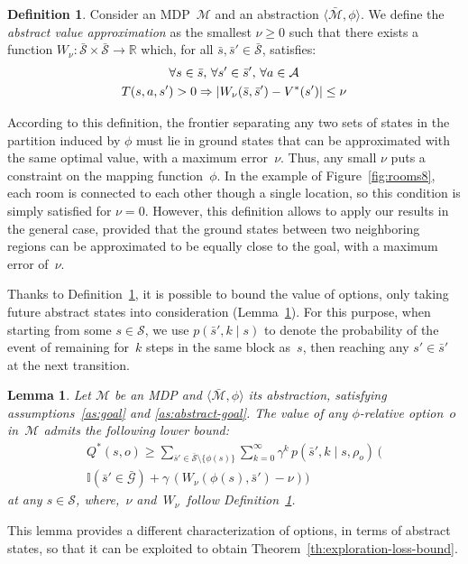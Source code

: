 \documentclass[letterpaper]{article} %
\theoremstyle{plain}
\newtheorem{lemma}{Lemma}
\theoremstyle{definition}
\newtheorem{definition}{Definition}
\theoremstyle{remark}
\DeclarePairedDelimiter{\abs}{\lvert}{\rvert}
\newcommand{\Reals}{\mathbb{R}}
\newcommand{\Given}{\mid}
\newcommand{\Indicator}{\mathbb{I}}
\renewcommand{\implies}{\Rightarrow}
\renewcommand{\implies}{\Rightarrow}
\newcommand{\SetSym}[1]{\mathcal{#1}}
\newcommand{\Policy}{\rho}
\newcommand{\States}{\SetSym{S}}
\newcommand{\Actions}{\SetSym{A}}
\newcommand{\Model}{\SetSym{M}}
\newcommand{\Mapping}{\phi}
\newcommand{\Abst}[1]{\bar{#1}}
\newcommand{\Goals}{\SetSym{G}}
\newcommand{\FromBlockTo}[3]{{#3}, {#2}}
\newcommand{\PHomogeneity}{\nu}
\begin{document}
\begin{definition}
Consider an MDP~$\Model$ and an abstraction $\langle \Abst\Model, \Mapping \rangle$.
We define the \emph{abstract value approximation} as the smallest $\PHomogeneity \ge 0$ such that
there exists a function $W_{\PHomogeneity}: {\Abst\States \times \Abst\States \to \Reals}$
which, for all $\Abst{s}, \Abst{s}' \in \Abst\States$, satisfies:
\begin{multline}
\forall s \in \Abst{s},\, \forall s' \in \Abst{s}',\, \forall a \in \Actions\\
T(s, a, s') > 0 \implies  \abs{W_\PHomogeneity(\Abst{s}, \Abst{s}') - V^*(s')} \le \PHomogeneity
\label{eq:equipotentials}
\end{multline}
\label{def:equipotentials}
\end{definition}
According to this definition, the frontier separating any two sets of states in the partition induced by $\Mapping$
must lie in ground states that can be approximated with the same optimal value, with a maximum error~$\PHomogeneity$.
Thus, any small $\PHomogeneity$ puts a constraint on the mapping function~$\Mapping$.
In the example of Figure~\ref{fig:rooms8}, each room is connected to each other though a single location, so this condition is simply satisfied for $\PHomogeneity = 0$.
However, this definition allows to apply our results in the general case,
provided that the ground states between two neighboring regions can be approximated to be equally close to the goal, with a maximum error of~$\PHomogeneity$.

Thanks to Definition~\ref{def:equipotentials}, it is possible to bound the value of options, only taking future abstract states into consideration (Lemma~\ref{lem:marginalized-optq}).
For this purpose, when starting from some \mbox{$s \in \States$},
we use $p(\FromBlockTo{s}{k}{\Abst{s}'} \Given s)$ to denote the probability of the event of remaining for~$k$ steps in the same block as~$s$,
then reaching any \mbox{$s' \in \Abst{s}'$} at the next transition.
\begin{lemma}
Let $\Model$ be an MDP and $\langle \Abst{\Model}, \Mapping \rangle$ its abstraction, satisfying assumptions~\ref{as:goal} and \ref{as:abstract-goal}.
The value of any $\Mapping$-relative option~$o$ in~$\Model$ admits the following lower bound:
\begin{multline}
Q^*(s, o) \ge
\sum_{\Abst{s}' \in \Abst\States \setminus \{\Mapping(s)\}} \sum_{k=0}^{\infty}
\gamma^k\, p(\FromBlockTo{s}{k}{\Abst{s}'} \Given s, \Policy_{o})\,
\bigl(\\
\Indicator(\Abst{s}' \in \Abst{\Goals}) + \gamma\, (W_\PHomogeneity(\Mapping(s), \Abst{s}') - \PHomogeneity) \bigr)
\end{multline}
at any $s \in \States$, where,~$\PHomogeneity$ and~$W_\PHomogeneity$\, follow Definition~\ref{def:equipotentials}.
\label{lem:marginalized-optq}
\end{lemma}
This lemma provides a different characterization of options, in terms of abstract states, so that it can be exploited to obtain Theorem~\ref{th:exploration-loss-bound}.
\end{document}
